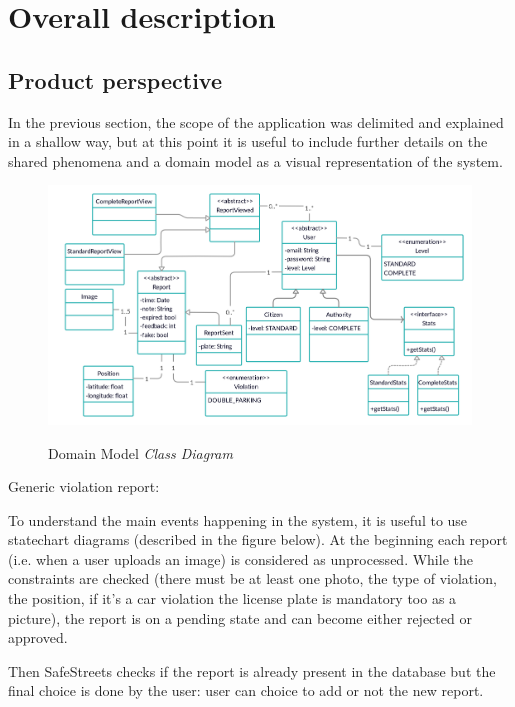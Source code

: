 \documentclass[../RASD.tex]{subfiles}
\begin{document}
    \chapter{Overall description}\label{ch:overall-description}
    \section{Product perspective}\label{sec:product-perspective}
    In the previous section, the scope of the application was delimited and explained in a shallow way, but at this point it is useful to include further details on the shared phenomena and a domain model as a visual representation of the system.

    \begin{figure}[H]
        \centering
        \includegraphics[scale = 1.1]{assets/domainModel.png}\\[1.6 cm]
        \caption[Domain Model \textit{Class Diagram}]{Domain Model \textit{Class Diagram}}
    \end{figure}
    Generic violation report:

    To understand the main events happening in the system, it is useful to use statechart diagrams (described in the figure below). At the beginning each report (i.e. when a user uploads an image) is considered as unprocessed. While the constraints are checked (there must be at least one photo, the type of violation, the position, if it’s a car violation the license plate is mandatory too as a picture), the report is on a pending state and can become either rejected or approved.

    Then SafeStreets checks if the report is already present in the database but the final choice is done by the user: user can choice to add or not the new report.
\end{document}
